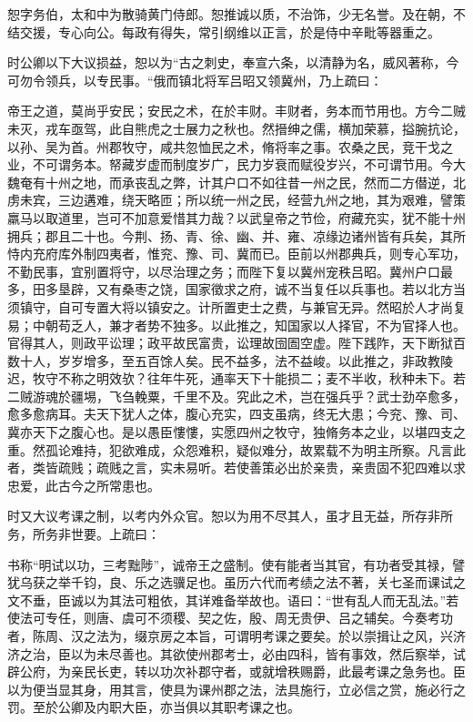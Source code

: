 \documentclass[12pt,UTF8]{ctexbook}
\begin{document}
恕字务伯，太和中为散骑黄门侍郎。恕推诚以质，不治饰，少无名誉。及在朝，不结交援，专心向公。每政有得失，常引纲维以正言，於是侍中辛毗等器重之。

时公卿以下大议损益，恕以为“古之刺史，奉宣六条，以清静为名，威风著称，今可勿令领兵，以专民事。“俄而镇北将军吕昭又领冀州，乃上疏曰：

帝王之道，莫尚乎安民；安民之术，在於丰财。丰财者，务本而节用也。方今二贼未灭，戎车亟驾，此自熊虎之士展力之秋也。然搢绅之儒，横加荣慕，搤腕抗论，以孙、吴为首。州郡牧守，咸共忽恤民之术，脩将率之事。农桑之民，竞干戈之业，不可谓务本。帑藏岁虚而制度岁广，民力岁衰而赋役岁兴，不可谓节用。今大魏奄有十州之地，而承丧乱之弊，计其户口不如往昔一州之民，然而二方僣逆，北虏未宾，三边遘难，绕天略匝；所以统一州之民，经营九州之地，其为艰难，譬策羸马以取道里，岂可不加意爱惜其力哉？以武皇帝之节俭，府藏充实，犹不能十州拥兵；郡且二十也。今荆、扬、青、徐、幽、并、雍、凉缘边诸州皆有兵矣，其所恃内充府库外制四夷者，惟兖、豫、司、冀而已。臣前以州郡典兵，则专心军功，不勤民事，宜别置将守，以尽治理之务；而陛下复以冀州宠秩吕昭。冀州户口最多，田多垦辟，又有桑枣之饶，国家徵求之府，诚不当复任以兵事也。若以北方当须镇守，自可专置大将以镇安之。计所置吏士之费，与兼官无异。然昭於人才尚复易；中朝苟乏人，兼才者势不独多。以此推之，知国家以人择官，不为官择人也。官得其人，则政平讼理；政平故民富贵，讼理故囹圄空虚。陛下践阼，天下断狱百数十人，岁岁增多，至五百馀人矣。民不益多，法不益峻。以此推之，非政教陵迟，牧守不称之明效欤？往年牛死，通率天下十能损二；麦不半收，秋种未下。若二贼游魂於疆埸，飞刍輓粟，千里不及。究此之术，岂在强兵乎？武士劲卒愈多，愈多愈病耳。夫天下犹人之体，腹心充实，四支虽病，终无大患；今兖、豫、司、冀亦天下之腹心也。是以愚臣慺慺，实愿四州之牧守，独脩务本之业，以堪四支之重。然孤论难持，犯欲难成，众怨难积，疑似难分，故累载不为明主所察。凡言此者，类皆疏贱；疏贱之言，实未易听。若使善策必出於亲贵，亲贵固不犯四难以求忠爱，此古今之所常患也。

时又大议考课之制，以考内外众官。恕以为用不尽其人，虽才且无益，所存非所务，所务非世要。上疏曰：

书称“明试以功，三考黜陟”，诚帝王之盛制。使有能者当其官，有功者受其禄，譬犹乌获之举千钧，良、乐之选骥足也。虽历六代而考绩之法不著，关七圣而课试之文不垂，臣诚以为其法可粗依，其详难备举故也。语曰：“世有乱人而无乱法。”若使法可专任，则唐、虞可不须稷、契之佐，殷、周无贵伊、吕之辅矣。今奏考功者，陈周、汉之法为，缀京房之本旨，可谓明考课之要矣。於以崇揖让之风，兴济济之治，臣以为未尽善也。其欲使州郡考士，必由四科，皆有事效，然后察举，试辟公府，为亲民长吏，转以功次补郡守者，或就增秩赐爵，此最考课之急务也。臣以为便当显其身，用其言，使具为课州郡之法，法具施行，立必信之赏，施必行之罚。至於公卿及内职大臣，亦当俱以其职考课之也。
\end{document}
